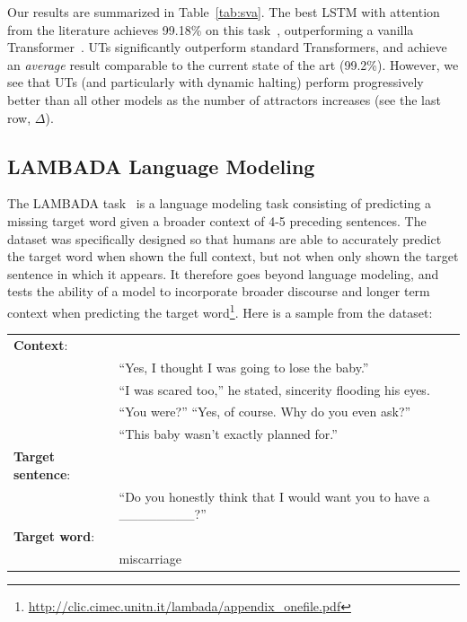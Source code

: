 
Our results are summarized in Table~\ref{tab:sva}. The best LSTM with attention from the literature achieves 99.18\% on this task~\citep{yogatama2018memory}, outperforming a vanilla Transformer~\citep{tran18}. UTs significantly outperform standard Transformers, and achieve an \emph{average} result comparable to the current state of the art (99.2\%). However, we see that UTs (and particularly with dynamic halting) perform progressively better than all other models as the number of attractors increases (see the last row, $\Delta$).




\subsection{LAMBADA Language Modeling}
The LAMBADA task~\citep{paperno2016lambada} is a language modeling task consisting of predicting a missing target word given a broader context of 4-5 preceding sentences. The dataset was specifically designed so that humans are able to accurately predict the target word when shown the full context, but not when only shown the target sentence in which it appears. It therefore goes beyond language modeling, and tests the ability of a model to incorporate broader discourse and longer term context when predicting the target word\footnote{\url{http://clic.cimec.unitn.it/lambada/appendix_onefile.pdf}}.
Here is a sample from the dataset:

\begin{table}[h!]
\fontsize{8}{10}\selectfont
\begin{tabular}{l l}
\textbf{Context}: & \\
& ``Yes, I thought I was going to lose the baby.'' \\
&  ``I was scared too,'' he stated, sincerity flooding his eyes. \\ 
&  ``You were?'' ``Yes, of course. Why do you even ask?''  \\
&  ``This baby wasn't exactly planned for.''
\\
\textbf{Target sentence}: & \\
& ``Do you honestly think that I would want you to have a \_\_\_\_\_\_\_\_?'' 
\\
\textbf{Target word}:  & \\  
& miscarriage
\end{tabular}
\end{table}

